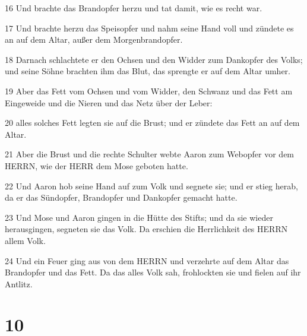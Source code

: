 \par 16 Und brachte das Brandopfer herzu und tat damit, wie es recht war.
\par 17 Und brachte herzu das Speisopfer und nahm seine Hand voll und zündete es an auf dem Altar, außer dem Morgenbrandopfer.
\par 18 Darnach schlachtete er den Ochsen und den Widder zum Dankopfer des Volks; und seine Söhne brachten ihm das Blut, das sprengte er auf dem Altar umher.
\par 19 Aber das Fett vom Ochsen und vom Widder, den Schwanz und das Fett am Eingeweide und die Nieren und das Netz über der Leber:
\par 20 alles solches Fett legten sie auf die Brust; und er zündete das Fett an auf dem Altar.
\par 21 Aber die Brust und die rechte Schulter webte Aaron zum Webopfer vor dem HERRN, wie der HERR dem Mose geboten hatte.
\par 22 Und Aaron hob seine Hand auf zum Volk und segnete sie; und er stieg herab, da er das Sündopfer, Brandopfer und Dankopfer gemacht hatte.
\par 23 Und Mose und Aaron gingen in die Hütte des Stifts; und da sie wieder herausgingen, segneten sie das Volk. Da erschien die Herrlichkeit des HERRN allem Volk.
\par 24 Und ein Feuer ging aus von dem HERRN und verzehrte auf dem Altar das Brandopfer und das Fett. Da das alles Volk sah, frohlockten sie und fielen auf ihr Antlitz.

\chapter{10}

